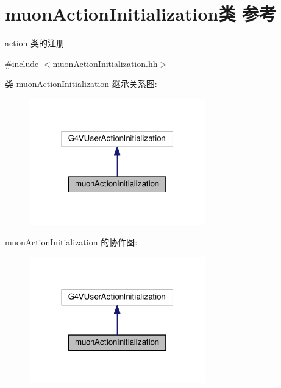 \hypertarget{classmuonActionInitialization}{}\section{muon\+Action\+Initialization类 参考}
\label{classmuonActionInitialization}


action 类的注册  




{\ttfamily \#include $<$muon\+Action\+Initialization.\+hh$>$}



类 muon\+Action\+Initialization 继承关系图\+:\nopagebreak
\begin{figure}[H]
\begin{center}
\leavevmode
\includegraphics[width=217pt]{classmuonActionInitialization__inherit__graph}
\end{center}
\end{figure}


muon\+Action\+Initialization 的协作图\+:\nopagebreak
\begin{figure}[H]
\begin{center}
\leavevmode
\includegraphics[width=217pt]{classmuonActionInitialization__coll__graph}
\end{center}
\end{figure}
